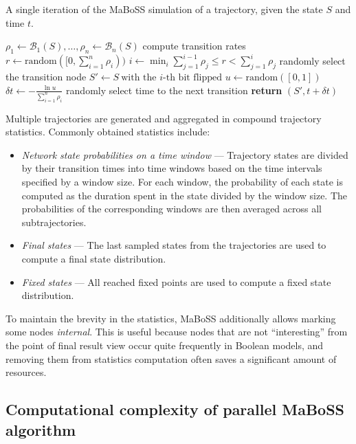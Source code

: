 \documentclass[sn-mathphys-num]{sn-jnl}%
\begin{document}
\begin{algorithm}
\caption{A single iteration of the MaBoSS simulation of a trajectory, given the state $S$ and time $t$.}
\label{alg:iter}
\begin{algorithmic}[1]
\State $\rho_1 \gets \mathcal{B}_1(S), \dots, \rho_n \gets \mathcal{B}_n(S)$ \Comment compute transition rates
\State $r \gets \text{random}([0, \sum_{i=1}^n \rho_i))$
\State $i \gets \min_i \sum_{j=1}^{i-1} \rho_j \leq r < \sum_{j=1}^{i} \rho_j$ \Comment randomly select the transition node
\State $S'\gets S\ \text{with the $i$-th bit flipped}$
\State $u \gets \text{random}([0, 1])$
\State $\delta t \gets -\frac{\ln u}{\sum_{i=1}^n \rho_i}$ \Comment randomly select time to the next transition
\State \textbf{return} $(S', t + \delta t)$
\EndProcedure
\end{algorithmic}
\end{algorithm}

Multiple trajectories are generated and aggregated in compound trajectory statistics. Commonly obtained statistics include:
\begin{itemize}
    \item \emph{Network state probabilities on a time window} --- Trajectory states are divided by their transition times into time windows based on the time intervals specified by a window size. For each window, the probability of each state is computed as the duration spent in the state divided by the window size. The probabilities of the corresponding windows are then averaged across all subtrajectories.
    \item \emph{Final states} --- The last sampled states from the trajectories are used to compute a final state distribution.
    \item \emph{Fixed states} --- All reached fixed points are used to compute a fixed state distribution.
\end{itemize}

To maintain the brevity in the statistics, MaBoSS additionally allows marking some nodes \emph{internal}.
This is useful because nodes that are not ``interesting'' from the point of final result view occur quite frequently in Boolean models, and removing them from statistics computation often saves a significant amount of resources.

\subsection{Computational complexity of parallel MaBoSS algorithm}
\end{document}
